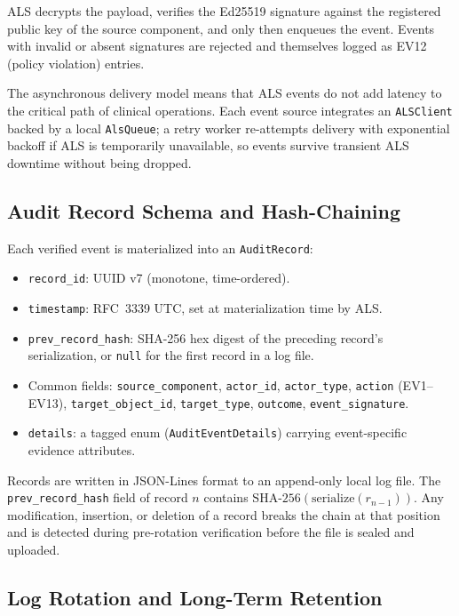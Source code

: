ALS decrypts the payload, verifies the Ed25519 signature against the
registered public key of the source component, and only then enqueues the
event. Events with invalid or absent signatures are rejected and themselves
logged as EV12 (policy violation) entries.

The asynchronous delivery model means that ALS events do not add latency
to the critical path of clinical operations. Each event source integrates an
\texttt{ALSClient} backed by a local \texttt{AlsQueue}; a retry worker
re-attempts delivery with exponential backoff if ALS is temporarily
unavailable, so events survive transient ALS downtime without being dropped.

\subsection{Audit Record Schema and Hash-Chaining}

Each verified event is materialized into an \texttt{AuditRecord}:

\begin{itemize}
    \item \texttt{record\_id}: UUID v7 (monotone, time-ordered).
    \item \texttt{timestamp}: RFC~3339 UTC, set at materialization time by ALS.
    \item \texttt{prev\_record\_hash}: SHA-256 hex digest of the preceding
    record's serialization, or \texttt{null} for the first record in a log
    file.
    \item Common fields: \texttt{source\_component}, \texttt{actor\_id},
    \texttt{actor\_type}, \texttt{action} (EV1--EV13), \texttt{target\_object\_id},
    \texttt{target\_type}, \texttt{outcome}, \texttt{event\_signature}.
    \item \texttt{details}: a tagged enum (\texttt{AuditEventDetails})
    carrying event-specific evidence attributes.
\end{itemize}

Records are written in JSON-Lines format to an append-only local log file.
The \texttt{prev\_record\_hash} field of record $n$ contains
$\text{SHA-256}(\text{serialize}(r_{n-1}))$. Any modification, insertion, or
deletion of a record breaks the chain at that position and is detected
during pre-rotation verification before the file is sealed and uploaded.

\subsection{Log Rotation and Long-Term Retention}


